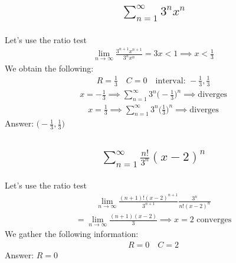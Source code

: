 \documentclass{article}
\begin{document}
\subsection{
	\begin{align*}
		\sum_{n = 1}^{\infty} 3^n x^n
	\end{align*}
}
Let's use the ratio test
\begin{align*}
	\lim_{n \to \infty} {\frac{3^{n + 1} x^{n + 1}}{3^n x^n}} = 3x < 1 \implies x < \frac{1}{3}
\end{align*}
We obtain the following:
\begin{align*}
	R = \frac{1}{3} \quad C = 0 \quad \text{interval: } -\frac{1}{3}, \frac{1}{3}
\end{align*}
\begin{align*}
	x = -\frac{1}{3} \implies \sum_{n = 1}^{\infty} 3^n \bigg( -\frac{1}{3} \bigg)^n \implies \text{diverges}
 \end{align*}
 \begin{align*}
 	x = \frac{1}{3} \implies \sum_{n = 1}^{\infty} 3^n \bigg( \frac{1}{3} \bigg)^n \implies \text{diverges}
 \end{align*}
 Answer: $\bigg( -\frac{1}{3}, \frac{1}{3} \bigg)$

\subsection{
	\begin{align*}
		\sum_{n = 1}^{\infty} \frac{n!}{3^n} (x - 2)^n
	\end{align*}
}
Let's use the ratio test
\begin{align*}
	\lim_{n \to \infty} {\frac{(n + 1)! (x - 2)^{n + 1}}{3^{n + 1}} \frac{3^n}{n! (x - 2)^n}} 
\end{align*}
\begin{align*}
	= \lim_{n \to \infty} {\frac{(n + 1)(x - 2)}{3}} \implies x = 2 \text{ converges}
\end{align*}
We gather the following information:
\begin{align*}
	R = 0 \quad C = 2
\end{align*}
Answer: $R = 0$

\end{document}
